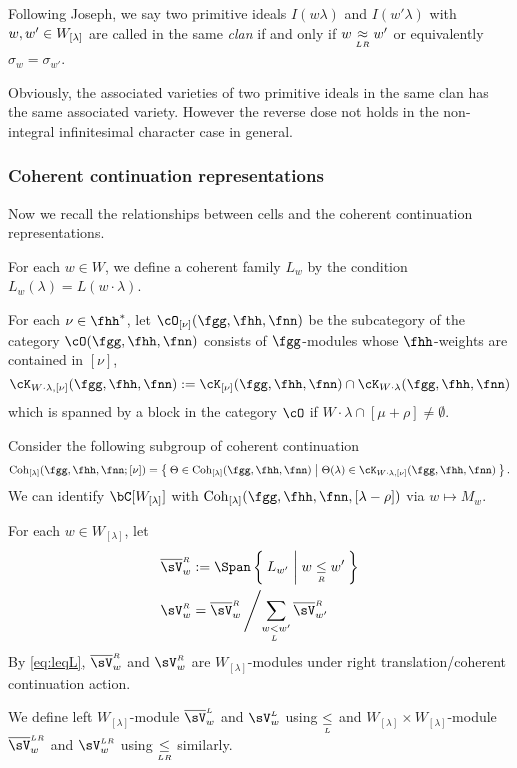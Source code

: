 \documentclass[counting_main.tex]{subfiles}
\begin{document}
Following Joseph, we say two primitive ideals $I(w\lambda)$ and $I(w'\lambda)$
with $w, w'\in W_{{[\lambda]}}$ are called in the same \emph{clan} if and only if
$w\mathrel{\mathop{\approx}\limits_{\scriptscriptstyle LR}} w'$ or equivalently $\sigma_{w}=\sigma_{w'}$.

Obviously, the associated varieties of two primitive ideals in the same clan has
the same associated variety. However the reverse dose not holds in the
non-integral infinitesimal character case in general.

\subsubsection*{Coherent continuation representations}
Now we recall the relationships between cells and the coherent continuation
representations.

For each $w\in W$, we define a coherent family $L_{w}$ by the condition
$L_{w}(\lambda) = L(w\cdot \lambda)$.

For each $\nu\in \fhh^{*}$, let $\cO_{[\nu]}(\fgg,\fhh,\fnn)$ be the subcategory
of the category $\cO(\fgg,\fhh,\fnn)$ consists of $\fgg$-modules whose
$\fhh$-weights are contained in $[\nu]$,
\[
  \Grt_{W\cdot\lambda,[\nu]}(\fgg,\fhh,\fnn) := \Grt_{[\nu]}(\fgg,\fhh,\fnn)\cap \Grt_{W\cdot \lambda}(\fgg,\fhh,\fnn)
\]
which is spanned by a block in the category $\cO$ if
$W\cdot \lambda \cap [\mu+\rho]\neq \emptyset$.

Consider the following subgroup of coherent continuation
\[
  \Coh_{[\lambda]}(\fgg,\fhh,\fnn; [\nu]) = \Set{\Theta\in \Coh_{[\lambda]}(\fgg,\fhh,\fnn)| \Theta(\lambda) \in \Grt_{W\cdot \lambda, [\nu]}(\fgg,\fhh,\fnn) }.
\]
We can identify $\bC[\WLam]$ with $\Coh_{\Lam}(\fgg,\fhh,\fnn,[\lambda-\rho])$
via $w \mapsto M_{w}$.

For each $w\in W_{[\lambda]}$, let
\[
  \begin{split}
    \bVR_{w}& :=\Span\Set{L_{w'}|w\leqR w'} \\
    \VR_{w}&= \bVR _{w}\left/ \sum_{w\lneqL w'} \bVR_{w'} \right.
  \end{split}
\]
By \eqref{eq:leqL}, $\bVR_{w}$ and $\VR_{w}$ are $W_{[\lambda]}$-modules under
right translation/coherent continuation action.

We define left $W_{[\lambda]}$-module $\bVL_{w}$ and $\VL_{w}$ using $\mathrel{\mathop{\leq}\limits_{\scriptscriptstyle L}}$ and
$W_{[\lambda]}\times W_{[\lambda]}$-module $\bVLR_{w}$ and $\VLR_{w}$ using
$\mathrel{\mathop{\leq}\limits_{\scriptscriptstyle LR}}$ similarly.
\end{document}
